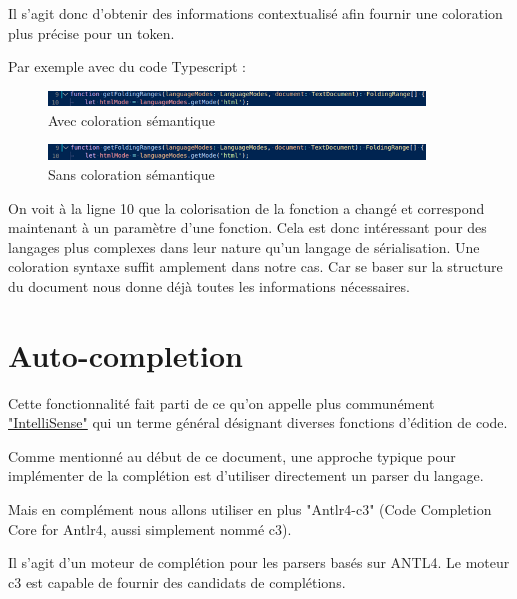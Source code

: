 \documentclass[
    iict, %
    il, %
]{heig-tb}
\begin{document}
Il s'agit donc d'obtenir des informations contextualisé afin fournir une coloration plus précise pour un token.

Par exemple avec du code Typescript :

\begin{figure}[!ht]
    \begin{center}
        \includegraphics[width=10cm]{assets/figures/semantic-coloration-with.png}
    \end{center}
    \caption[Avec coloration sémantique ]{\label{semantic-coloration-with} Avec coloration sémantique }
\end{figure}

\begin{figure}[!ht]
    \begin{center}
        \includegraphics[width=10cm]{assets/figures/semantic-coloration-without.png}
    \end{center}
    \caption[Sans coloration sémantique]{\label{semantic-coloration-without} Sans coloration sémantique}
\end{figure}

On voit à la ligne 10 que la colorisation de la fonction a changé et correspond maintenant à un paramètre d'une fonction.
Cela est donc intéressant pour des langages plus complexes dans leur nature qu'un langage de sérialisation. Une coloration syntaxe suffit amplement dans notre cas.
Car se baser sur la structure du document nous donne déjà toutes les informations nécessaires.

\section{Auto-completion}
Cette fonctionnalité fait parti de ce qu'on appelle plus communément \href{https://code.visualstudio.com/docs/editor/intellisense}{"IntelliSense"} qui un terme général désignant diverses fonctions d'édition de code.

Comme mentionné au début de ce document, une approche typique pour implémenter de la complétion est d'utiliser directement un parser du langage.

Mais en complément nous allons utiliser en plus "Antlr4-c3" (Code Completion Core for Antlr4, aussi simplement nommé c3).

Il s'agit d'un moteur de complétion pour les parsers basés sur ANTL4. Le moteur c3 est capable de fournir des candidats de complétions.
\end{document}
